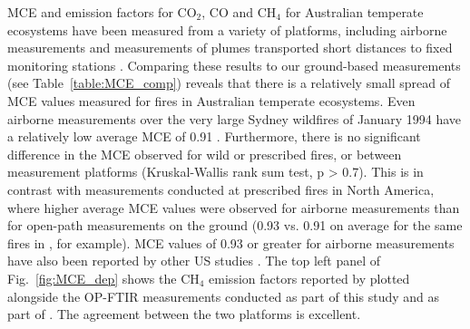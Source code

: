 \documentclass[acp, manuscript]{copernicus}
\providecommand{\DIFaddbeginFL}{} %
\providecommand{\DIFaddendFL}{} %
\providecommand{\DIFdelendFL}{} %
\begin{document}
\begin{table}

\DIFdelendFL \DIFaddbeginFL {} \DIFaddendFL %
 \label{table:MCE_comp}
\end{table}


MCE and emission factors for CO$_2$, CO and CH$_4$ for Australian temperate ecosystems have been measured from a variety of platforms, including airborne measurements \citep{Hurst1996} and measurements of plumes transported short distances to fixed monitoring stations \citep{Lawson2015,Rea2016}. Comparing these results to our ground-based measurements (see Table~\ref{table:MCE_comp}) reveals that %
there is a relatively small spread of MCE values measured for fires in Australian temperate ecosystems. Even airborne measurements over the very large Sydney wildfires of January 1994 have a relatively low average MCE of 0.91 \citep{Hurst1996}. Furthermore, there is no significant difference in the MCE observed for wild or prescribed fires, or between measurement platforms (Kruskal-Wallis rank sum test, p > 0.7). This is in contrast with measurements conducted at prescribed fires in North America, where higher average MCE values were observed for airborne measurements than for open-path measurements on the ground (0.93 vs. 0.91 on average for the same fires in \citet{Akagi2014}, for example). MCE values of 0.93 or greater for airborne measurements have also been reported by other US studies \citep{Burling2011, Akagi2013}. The top left panel of Fig.~\ref{fig:MCE_dep} shows the CH$_4$ emission factors reported by \citet{Hurst1996} plotted alongside the OP-FTIR measurements conducted as part of this study and as part of \citet{Paton-Walsh2014}. The agreement between the two platforms is excellent. 
\end{document}
